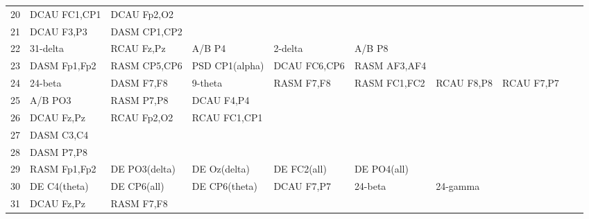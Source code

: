 \begin{landscape}
\begin{table}[]
\begin{tabular}{l|llllllll}
20       & DCAU FC1,CP1   & DCAU Fp2,O2    &                &                &                &                &               &                &               &               \\
21       & DCAU F3,P3     & DASM CP1,CP2   &                &                &                &                &               &                &               &               \\
22       & 31-delta       & RCAU Fz,Pz     & A/B P4         & 2-delta        & A/B P8         &                &               &                &               &               \\
23       & DASM Fp1,Fp2   & RASM CP5,CP6   & PSD CP1(alpha) & DCAU FC6,CP6   & RASM AF3,AF4   &                &               &                &               &               \\
24       & 24-beta        & DASM F7,F8     & 9-theta        & RASM F7,F8     & RASM FC1,FC2   & RCAU F8,P8     & RCAU F7,P7    &                &               &               \\
25       & A/B PO3        & RASM P7,P8     & DCAU F4,P4     &                &                &                &               &                &               &               \\
26       & DCAU Fz,Pz     & RCAU Fp2,O2    & RCAU FC1,CP1   &                &                &                &               &                &               &               \\
27       & DASM C3,C4     &                &                &                &                &                &               &                &               &               \\
28       & DASM P7,P8     &                &                &                &                &                &               &                &               &               \\
29       & RASM Fp1,Fp2   & DE PO3(delta)  & DE Oz(delta)   & DE FC2(all)    & DE PO4(all)    &                &               &                &               &               \\
30       & DE C4(theta)   & DE CP6(all)    & DE CP6(theta)  & DCAU F7,P7     & 24-beta        & 24-gamma       &               &                &               &               \\
31       & DCAU Fz,Pz     & RASM F7,F8     &                &                &                &                &               &                &               &               \\
\end{tabular}
\end{table}
\end{landscape}
